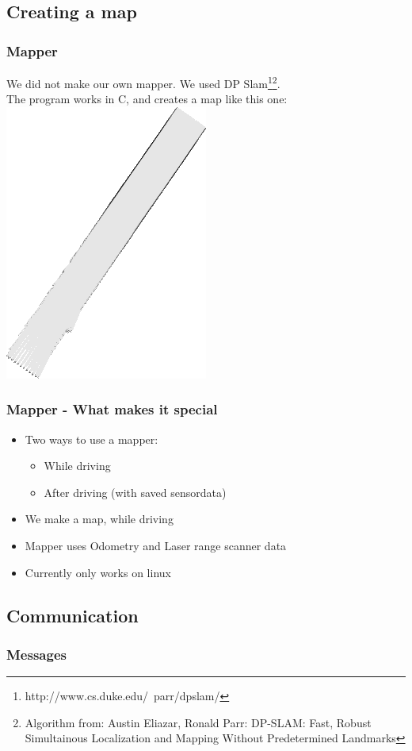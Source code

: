 \documentclass{beamer}
\begin{document}
\subsection{Creating a map}
\begin{frame}
\frametitle{Mapper}
We did not make our own mapper. We used DP
Slam\footnote{http://www.cs.duke.edu/~parr/dpslam/}\footnote{Algorithm from: Austin Eliazar,
Ronald Parr: DP-SLAM: Fast, Robust Simultainous Localization and Mapping Without
Predetermined Landmarks}.\\
The program works in C, and creates a map like this one:
\includegraphics[height=.5\textheight]{hmap00}
\end{frame}

\begin{frame}
\frametitle{Mapper - What makes it special}
\begin{itemize}
    \item Two ways to use a mapper:
    \begin{itemize}
        \item While driving
        \item After driving (with saved sensordata)
    \end{itemize}
    \item We make a map, while driving
    \item Mapper uses Odometry and Laser range scanner data
    \item Currently only works on linux
    \end{itemize}
\end{frame}

\subsection{Communication}
\begin{frame}
\frametitle{Messages}
\end{frame}
\end{document}
